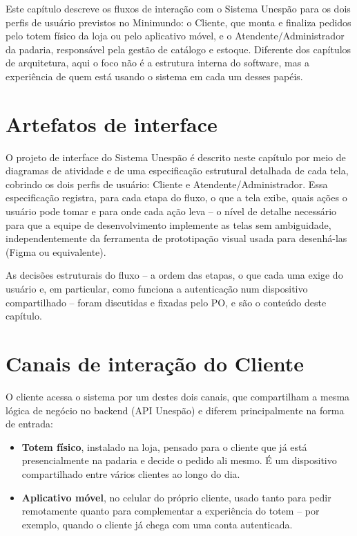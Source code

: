 \documentclass[a4paper,12pt,oneside,openany]{book}
\begin{document}
Este capítulo descreve os fluxos de interação com o Sistema Unespão para os dois perfis de usuário previstos no Minimundo: o Cliente, que monta e finaliza pedidos pelo totem físico da loja ou pelo aplicativo móvel, e o Atendente/Administrador da padaria, responsável pela gestão de catálogo e estoque. Diferente dos capítulos de arquitetura, aqui o foco não é a estrutura interna do software, mas a experiência de quem está usando o sistema em cada um desses papéis.

\section{Artefatos de interface}

O projeto de interface do Sistema Unespão é descrito neste capítulo por meio de diagramas de atividade e de uma especificação estrutural detalhada de cada tela, cobrindo os dois perfis de usuário: Cliente e Atendente/Administrador. Essa especificação registra, para cada etapa do fluxo, o que a tela exibe, quais ações o usuário pode tomar e para onde cada ação leva -- o nível de detalhe necessário para que a equipe de desenvolvimento implemente as telas sem ambiguidade, independentemente da ferramenta de prototipação visual usada para desenhá-las (Figma ou equivalente).

As decisões estruturais do fluxo -- a ordem das etapas, o que cada uma exige do usuário e, em particular, como funciona a autenticação num dispositivo compartilhado -- foram discutidas e fixadas pelo PO, e são o conteúdo deste capítulo.

\section{Canais de interação do Cliente}

O cliente acessa o sistema por um destes dois canais, que compartilham a mesma lógica de negócio no backend (API Unespão) e diferem principalmente na forma de entrada:

\begin{itemize}
    \item \textbf{Totem físico}, instalado na loja, pensado para o cliente que já está presencialmente na padaria e decide o pedido ali mesmo. É um dispositivo compartilhado entre vários clientes ao longo do dia.
    \item \textbf{Aplicativo móvel}, no celular do próprio cliente, usado tanto para pedir remotamente quanto para complementar a experiência do totem -- por exemplo, quando o cliente já chega com uma conta autenticada.
\end{itemize}
\end{document}
